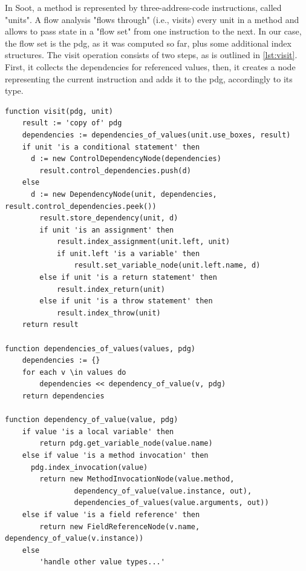 In Soot, a method is represented by three-address-code instructions, called "units".
A flow analysis "flows through" (i.e., visits) every unit in a method and allows to pass state in a "flow set" from one instruction to the next.
In our case, the flow set is the \ac{pdg}, as it was computed so far, plus some additional index structures.
The visit operation consists of two steps, as is outlined in \cref{lst:visit}.
First, it collects the dependencies for referenced values, 
then, it creates a node representing the current instruction and adds it to the \ac{pdg}, accordingly to its type.

\begin{lstlisting}[firstnumber=1,float,caption={The algorithm of the visit operation.},stepnumber=5,label=lst:visit,gobble=0,language=algorithm,tabsize=2]
function visit(pdg, unit)
	result := 'copy of' pdg
	dependencies := dependencies_of_values(unit.use_boxes, result)
	if unit 'is a conditional statement' then
	  d := new ControlDependencyNode(dependencies)
		result.control_dependencies.push(d)
	else
	  d := new DependencyNode(unit, dependencies, result.control_dependencies.peek())
		result.store_dependency(unit, d)
		if unit 'is an assignment' then
			result.index_assignment(unit.left, unit)
			if unit.left 'is a variable' then
				result.set_variable_node(unit.left.name, d)
		else if unit 'is a return statement' then
			result.index_return(unit)
		else if unit 'is a throw statement' then
			result.index_throw(unit)
	return result

function dependencies_of_values(values, pdg)
	dependencies := {}
	for each v \in values do
		dependencies << dependency_of_value(v, pdg)
	return dependencies

function dependency_of_value(value, pdg)
	if value 'is a local variable' then
		return pdg.get_variable_node(value.name)
	else if value 'is a method invocation' then
	  pdg.index_invocation(value)
		return new MethodInvocationNode(value.method, 
				dependency_of_value(value.instance, out), 
				dependencies_of_values(value.arguments, out))
	else if value 'is a field reference' then
		return new FieldReferenceNode(v.name, dependency_of_value(v.instance))
	else 
		'handle other value types...'
\end{lstlisting}

